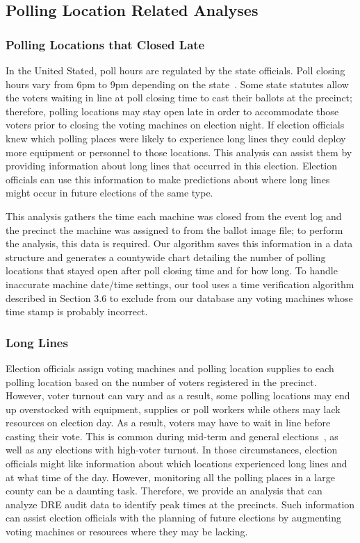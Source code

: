 \subsection{Polling Location Related Analyses}
\subsubsection{Polling Locations that Closed Late}
In the United Stated, poll hours are regulated by the state officials. Poll closing hours vary from 6pm to 9pm depending on the state~\cite{Info2007}. Some state statutes allow the voters waiting in line at poll closing time to cast their ballots at the precinct; therefore,  polling locations may stay open late in order to accommodate those voters prior to closing the voting machines on election night. If election officials knew which polling places were likely to experience long lines they could deploy more equipment or personnel to those locations. This analysis can assist them by providing information about long lines that occurred in this election. Election officials can use this information to make predictions about where long lines might occur in future elections of the same type.

This analysis gathers the time each machine was closed from the event log and the precinct the machine was assigned to from the ballot image file; to perform the analysis, this data is required.  Our algorithm saves this information in a data structure and generates a countywide chart detailing the number of polling locations that stayed open after poll closing time and for how long. To handle inaccurate machine date/time settings, our tool uses a time verification algorithm described in Section 3.6 to exclude from our database any voting machines whose time stamp is probably incorrect. 

\subsubsection{Long Lines}
Election officials assign voting machines and polling location supplies to each polling location based on the number of voters registered in the precinct.  However, voter turnout can vary and as a result, some polling locations may end up overstocked with equipment, supplies or poll workers while others may lack resources on election day. As a result, voters may have to wait in line before casting their vote. This is common during mid-term and general elections~\cite{Kreitman2010, Slade2008, U2010}, as well as any elections with high-voter turnout.  In those circumstances, election officials might like information about which locations experienced long lines and at what time of the day. However, monitoring all the polling places in a large county can be a daunting task. Therefore, we provide an analysis that can analyze DRE audit data to identify peak times at the precincts. Such information can assist election officials with the planning of future elections by augmenting voting machines or resources where they may be lacking.

